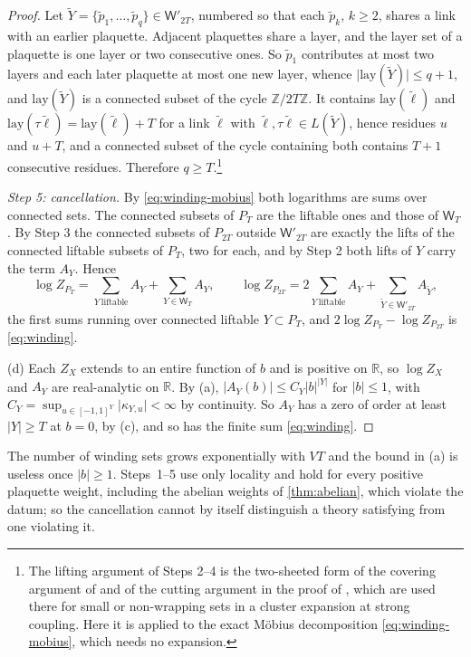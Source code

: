 \documentclass[11pt,a4paper]{amsart}
\theoremstyle{definition}
\theoremstyle{remark}
\numberwithin{equation}{section}
\newcommand{\R}{\mathbb{R}}          %
\newcommand{\Z}{\mathbb{Z}}          %
\newcommand{\abs}[1]{\lvert #1\rvert}      %
\newcommand{\Mcirc}{\text{\upshape(M$^{\circ}$)}}   %
\begin{document}
\begin{proof}
Let $\tilde Y=\{\tilde p_1,\dots,\tilde p_q\}\in\mathsf W'_{2T}$, numbered so that each $\tilde p_k$, $k\ge2$, shares a link with an earlier plaquette. Adjacent plaquettes share a layer, and the layer set of a plaquette is one layer or two consecutive ones. So $\tilde p_1$ contributes at most two layers and each later plaquette at most one new layer, whence $\abs{\mathrm{lay}(\tilde Y)}\le q+1$, and $\mathrm{lay}(\tilde Y)$ is a connected subset of the cycle $\Z/2T\Z$. It contains $\mathrm{lay}(\tilde\ell)$ and $\mathrm{lay}(\tau\tilde\ell)=\mathrm{lay}(\tilde\ell)+T$ for a link $\tilde\ell$ with $\tilde\ell,\tau\tilde\ell\in L(\tilde Y)$, hence residues $u$ and $u+T$, and a connected subset of the cycle containing both contains $T+1$ consecutive residues. Therefore $q\ge T$.\footnote{The lifting argument of Steps 2--4 is the two-sheeted form of the covering argument of \cite[Lemma~20]{bhattacharjee2026first} and of the cutting argument in the proof of \cite[Proposition~11]{bhattacharjee2026first}, which are used there for small or non-wrapping sets in a cluster expansion at strong coupling. Here it is applied to the exact M\"obius decomposition \eqref{eq:winding-mobius}, which needs no expansion.}

\emph{Step 5: cancellation.} By \eqref{eq:winding-mobius} both logarithms are sums over connected sets. The connected subsets of $P_T$ are the liftable ones and those of $\mathsf W_T$. By Step 3 the connected subsets of $P_{2T}$ outside $\mathsf W'_{2T}$ are exactly the lifts of the connected liftable subsets of $P_T$, two for each, and by Step 2 both lifts of $Y$ carry the term $A_Y$. Hence
\[
\log Z_{P_T}=\sum_{Y\ \text{liftable}}A_Y+\sum_{Y\in\mathsf W_T}A_Y,\qquad \log Z_{P_{2T}}=2\sum_{Y\ \text{liftable}}A_Y+\sum_{\tilde Y\in\mathsf W'_{2T}}A_{\tilde Y},
\]
the first sums running over connected liftable $Y\subset P_T$, and $2\log Z_{P_T}-\log Z_{P_{2T}}$ is \eqref{eq:winding}.

(d) Each $Z_X$ extends to an entire function of $b$ and is positive on $\R$, so $\log Z_X$ and $A_Y$ are real-analytic on $\R$. By (a), $\abs{A_Y(b)}\le C_Y\abs{b}^{\abs{Y}}$ for $\abs{b}\le1$, with $C_Y=\sup_{u\in[-1,1]^Y}\abs{\kappa_{Y,u}}<\infty$ by continuity. So $A_Y$ has a zero of order at least $\abs{Y}\ge T$ at $b=0$, by (c), and so has the finite sum \eqref{eq:winding}.
\end{proof}

The number of winding sets grows exponentially with $VT$ and the bound in (a) is useless once $\abs{b}\ge1$. Steps~1--5 use only locality and hold for every positive plaquette weight, including the abelian weights of \cref{thm:abelian}, which violate the datum; so the cancellation cannot by itself distinguish a theory satisfying \Mcirc{} from one violating it.
\end{document}
